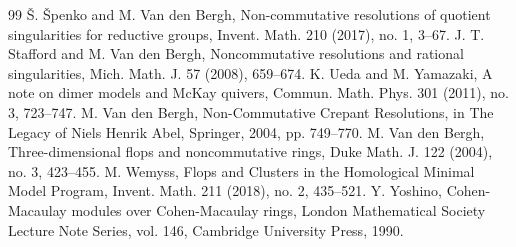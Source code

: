 \documentclass[11pt]{amsart}
\theoremstyle{definition}
\begin{document}
\begin{thebibliography}{99}
 Š. Špenko and M. Van den Bergh, Non-commutative resolutions of quotient singularities for reductive groups, Invent. Math. 210 (2017), no. 1, 3--67.
 J. T. Stafford and M. Van den Bergh, Noncommutative resolutions and rational singularities, Mich. Math. J. 57 (2008), 659--674.
 K. Ueda and M. Yamazaki, A note on dimer models and McKay quivers, Commun. Math. Phys. 301 (2011), no. 3, 723--747.
 M. Van den Bergh, Non-Commutative Crepant Resolutions, in The Legacy of Niels Henrik Abel, Springer, 2004, pp. 749--770.
 M. Van den Bergh, Three-dimensional flops and noncommutative rings, Duke Math. J. 122 (2004), no. 3, 423--455.
 M. Wemyss, Flops and Clusters in the Homological Minimal Model Program, Invent. Math. 211 (2018), no. 2, 435--521.
 Y. Yoshino, Cohen-Macaulay modules over Cohen-Macaulay rings, London Mathematical Society Lecture Note Series, vol. 146, Cambridge University Press, 1990.
\end{thebibliography}
\end{document}
